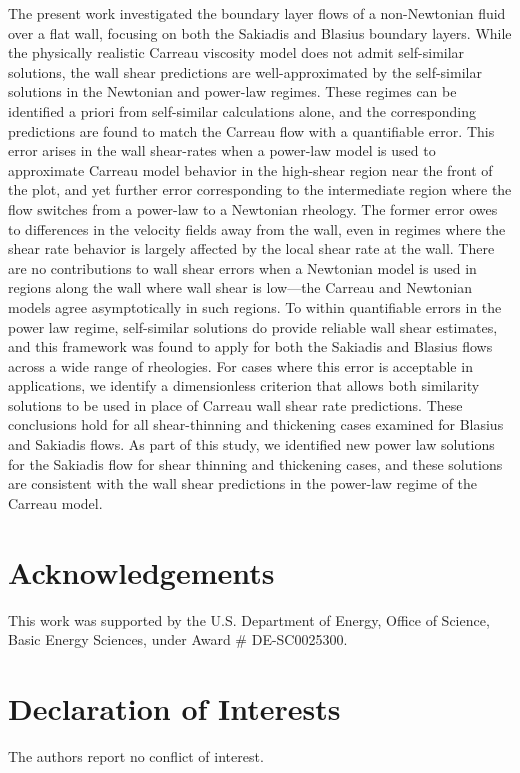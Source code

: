 \documentclass[lineno]{JFM-FLM_Au}
\begin{document}
The present work investigated the boundary layer flows of a non-Newtonian fluid over a flat wall, focusing on both the Sakiadis and Blasius boundary layers. While the physically realistic Carreau viscosity model does not admit self-similar solutions, the wall shear predictions are well-approximated by the self-similar solutions in the Newtonian and power-law regimes. These regimes can be identified a priori from self-similar calculations alone, and the corresponding predictions are found to match the Carreau flow with a quantifiable error. This error arises in the wall shear-rates when a power-law model is used to approximate Carreau model behavior in the high-shear region near the front of the plot, and yet further error corresponding to the intermediate region where the flow switches from a power-law to a Newtonian rheology. The former error owes to differences in the velocity fields away from the wall, even in regimes where the shear rate behavior is largely affected by the local shear rate at the wall. There are no contributions to wall shear errors when a Newtonian model is used in regions along the wall where wall shear is low---the Carreau and Newtonian models agree asymptotically in such regions. To within quantifiable errors in the power law regime, self-similar solutions do provide reliable wall shear estimates, and this framework was found to apply for both the Sakiadis and Blasius flows across a wide range of rheologies. For cases where this error is acceptable in applications, we identify a dimensionless criterion that allows both similarity solutions to be used in place of Carreau wall shear rate predictions. These conclusions hold for all shear-thinning and thickening cases examined for Blasius and Sakiadis flows. As part of this study, we identified new power law solutions for the Sakiadis flow for shear thinning and thickening cases, and these solutions are consistent with the wall shear predictions in the power-law regime of the Carreau model.

\section*{Acknowledgements}

This work was supported by the U.S. Department of Energy, Office of Science, Basic Energy Sciences, under Award \# DE-SC0025300.

\section*{Declaration of Interests}

The authors report no conflict of interest.



\end{document}
